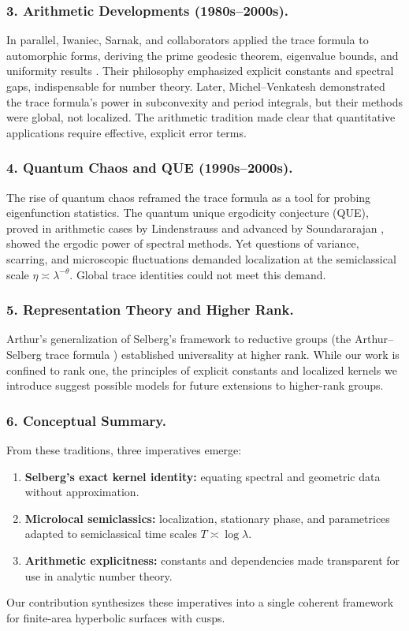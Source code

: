 \subsubsection*{3. Arithmetic Developments (1980s–2000s).}
In parallel, Iwaniec, Sarnak, and collaborators applied the trace formula to automorphic forms,
deriving the prime geodesic theorem, eigenvalue bounds, and uniformity results
\cite{Iwaniec2002,LuoSarnak1995}. Their philosophy emphasized explicit constants and spectral gaps,
indispensable for number theory. Later, Michel–Venkatesh \cite{MichelVenkatesh2010}
demonstrated the trace formula’s power in subconvexity and period integrals,
but their methods were global, not localized.
The arithmetic tradition made clear that quantitative applications
require effective, explicit error terms.

\subsubsection*{4. Quantum Chaos and QUE (1990s–2000s).}
The rise of quantum chaos reframed the trace formula as a tool
for probing eigenfunction statistics.
The quantum unique ergodicity conjecture (QUE), proved in arithmetic cases
by Lindenstrauss \cite{LindenstraussQUE} and advanced by Soundararajan \cite{SoundararajanQUE},
showed the ergodic power of spectral methods.
Yet questions of variance, scarring, and microscopic fluctuations demanded
localization at the semiclassical scale $\eta\asymp\lambda^{-\theta}$.
Global trace identities could not meet this demand.

\subsubsection*{5. Representation Theory and Higher Rank.}
Arthur’s generalization of Selberg’s framework to reductive groups
(the Arthur–Selberg trace formula \cite{ArthurBook})
established universality at higher rank.
While our work is confined to rank one,
the principles of explicit constants and localized kernels we introduce
suggest possible models for future extensions to higher-rank groups.

\subsubsection*{6. Conceptual Summary.}
From these traditions, three imperatives emerge:
\begin{enumerate}[label=\arabic*.]
  \item \textbf{Selberg’s exact kernel identity:}
        equating spectral and geometric data without approximation.
  \item \textbf{Microlocal semiclassics:}
        localization, stationary phase, and parametrices
        adapted to semiclassical time scales $T\asymp \log\lambda$.
  \item \textbf{Arithmetic explicitness:}
        constants and dependencies made transparent
        for use in analytic number theory.
\end{enumerate}
Our contribution synthesizes these imperatives into
a single coherent framework for finite-area hyperbolic surfaces with cusps.

